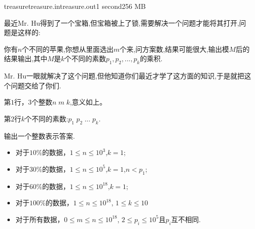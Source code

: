 \documentclass[11pt,a4paper,oneside]{article}
\begin{document}
\begin{problem}{treasure}{treasure.in}{treasure.out}{1 second}{256 MB}

	最近Mr. Hu得到了一个宝箱,但宝箱被上了锁,需要解决一个问题才能将其打开,问题是这样的:
	
	你有$n$个不同的苹果,你想从里面选出$m$个来,问方案数,结果可能很大,输出模$M$后的结果输出,其中$M$是$k$个不同的素数$p_1,p_2,...,p_k$的乘积.
	
	Mr. Hu一眼就解决了这个问题,但他知道你们最近才学了这方面的知识,于是就把这个问题交给了你们.
	

    \InputFile

    第$1$行，$3$个整数$n \; m \; k$,意义如上。
    
    第$2$行$k$个不同的素数:$p_1 \; p_2 \; ... \; p_k$.
   
    \OutputFile

	   输出一个整数表示答案.

    \Example

    \begin{example}
    \end{example}

    \Note
    
    \begin{itemize}
		\item 对于$10\%$的数据，$1 \leq n \leq 10^3$,$ k = 1 $;
        \item 对于$30\%$的数据，$1 \leq n \leq 10^5$,$ k = 1 $,$n < p_1$;
        \item 对于$60\%$的数据，$1 \leq n \leq 10^{18}$,$ k = 1 $; 
        \item 对于$100\%$的数据，$1 \leq n \leq 10^{18} $, $1 \leq k \leq 10 $
        \item 对于所有数据，$0 \leq m \leq n \leq 10^{18}$, $2 \leq p_i \leq 10^5$且$p_i$互不相同.
    \end{itemize}

\end{problem}
\end{document}
